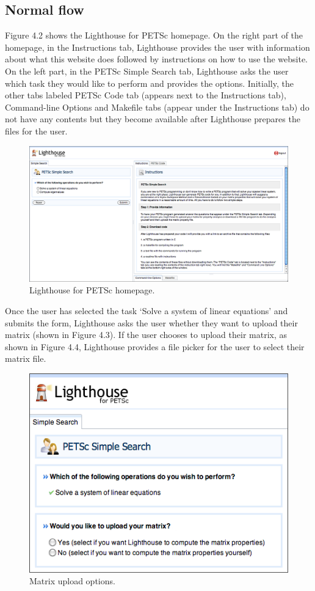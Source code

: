 \subsection{Normal flow}
Figure 4.2 shows the Lighthouse for PETSc homepage. On the right part of the homepage, in the Instructions tab, Lighthouse provides the user with information about what this website does followed by instructions on how to use the website. On the left part, in the PETSc Simple Search tab, Lighthouse asks the user which task they would like to perform and provides the options. Initially, the other tabs labeled PETSc Code tab (appears next to the Instructions tab), Command-line Options and Makefile tabs (appear under the Instructions tab) do not have any contents but they become available after Lighthouse prepares the files for the user.

\begin{figure}[H]\label{petscui1}
  \centering
  \includegraphics[width=6.5in]{figs/petsc_1}
  \caption[Lighthouse for PETSc homepage.]
   {Lighthouse for PETSc homepage.}
\end{figure}

\noindent Once the user has selected the task `Solve a system of linear equations' and submits the form, Lighthouse asks the user whether they want to upload their matrix (shown in Figure 4.3). If the user chooses to upload their matrix, as shown in Figure 4.4, Lighthouse provides a file picker for the user to select their matrix file. \\

\begin{figure}[H]\label{petscui2}
  \centering
  \includegraphics[width=4.5in]{figs/petsc_2}
  \caption[Matrix upload options.]
   {Matrix upload options.}
\end{figure} 

